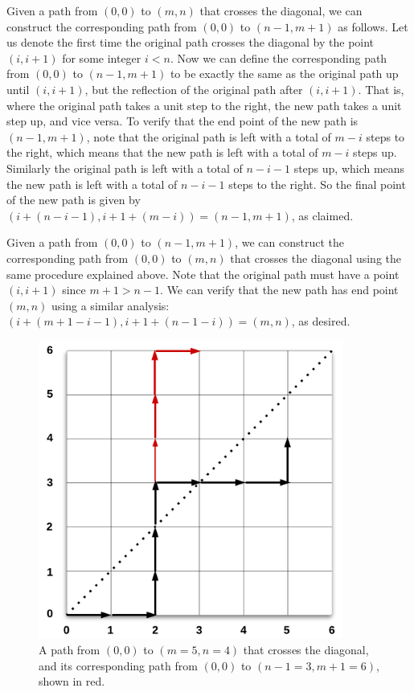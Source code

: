 \documentclass[12pt]{amsart}
\begin{document}
Given a path from $(0,0)$ to $(m,n)$ that crosses the diagonal, we can construct the corresponding path from $(0,0)$ to $(n-1,m+1)$ as follows. Let us denote the first time the original path crosses the diagonal by the point $(i,i+1)$ for some integer $i < n$. Now we can define the corresponding path from $(0,0)$ to $(n-1,m+1)$ to be exactly the same as the original path up until $(i,i+1)$, but the reflection of the original path after $(i,i+1)$. That is, where the original path takes a unit step to the right, the new path takes a unit step up, and vice versa. To verify that the end point of the new path is $(n-1,m+1)$, note that the original path is left with a total of $m-i$ steps to the right, which means that the new path is left with a total of $m-i$ steps up. Similarly the original path is left with a total of $n-i-1$ steps up, which means the new path is left with a total of $n-i-1$ steps to the right. So the final point of the new path is given by $(i+(n-i-1), i+1+(m-i)) = (n-1,m+1)$, as claimed.

Given a path from $(0,0)$ to $(n-1,m+1)$, we can construct the corresponding path from $(0,0)$ to $(m,n)$ that crosses the diagonal using the same procedure explained above. Note that the original path must have a point $(i,i+1)$ since $m+1>n-1$. We can verify that the new path has end point $(m,n)$ using a similar analysis: $(i+(m+1-i-1),i+1+(n-1-i)) = (m,n)$, as desired.

\begin{figure}
\includegraphics[width=10cm]{reflection.png}
\caption{A path from $(0,0)$ to $(m=5, n=4)$ that crosses the diagonal, and its corresponding path from $(0,0)$ to $(n-1=3, m+1=6)$, shown in red.}
\label{fig:reflection}
\end{figure}
\end{document}
